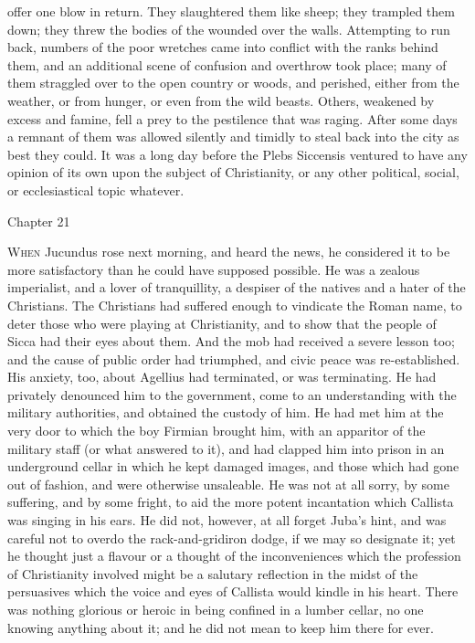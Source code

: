 offer one blow in return. They slaughtered them like sheep; they
trampled them down; they threw the bodies of the wounded over the
walls. Attempting to run back, numbers of the poor wretches came
into conflict with the ranks behind them, and an additional scene of
confusion and overthrow took place; many of them straggled over to the
open country or woods, and perished, either from the weather, or from
hunger, or even from the wild beasts. Others, weakened by excess and
famine, fell a prey to the pestilence that was raging. After some days
a remnant of them was allowed silently and timidly to steal back into
the city as best they could. It was a long day before the Plebs
Siccensis ventured to have any opinion of its own upon the subject of
Christianity, or any other political, social, or ecclesiastical topic
whatever.

Chapter 21


W\textsc{hen} Jucundus rose next morning, and heard the news, he
considered it to be more satisfactory than he could have supposed
possible. He was a zealous imperialist, and a lover of tranquillity, a
despiser of the natives and a hater of the Christians. The Christians
had suffered enough to vindicate the Roman name, to deter those who
were playing at Christianity, and to show that the people of Sicca had
their eyes about them. And the mob had received a severe lesson too;
and the cause of public order had triumphed, and civic peace was
re-established. His anxiety, too, about Agellius had terminated, or
was terminating. He had privately denounced him to the government,
come to an understanding with the military authorities, and obtained
the custody of him. He had met him at the very door to which the boy
Firmian brought him, with an apparitor of the military staff (or what
answered to it), and had clapped him into prison in an underground
cellar in which he kept damaged images, and those which had gone out
of fashion, and were otherwise unsaleable. He was not at all sorry, by
some suffering, and by some fright, to aid the more potent
incantation which Callista was singing in his ears. He did not,
however, at all forget Juba's hint, and was careful not to overdo the
rack-and-gridiron dodge, if we may so designate it; yet he thought
just a flavour or a thought of the inconveniences which the profession
of Christianity involved might be a salutary reflection in the midst
of the persuasives which the voice and eyes of Callista would kindle
in his heart. There was nothing glorious or heroic in being confined
in a lumber cellar, no one knowing anything about it; and he did not
mean to keep him there for ever.

